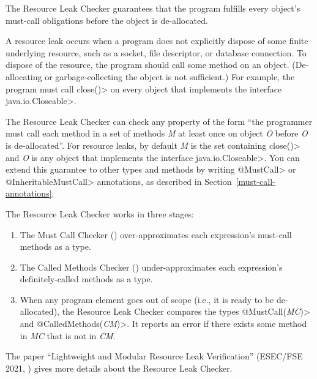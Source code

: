 \htmlhr
{}

The Resource Leak Checker guarantees that the program fulfills every object's
must-call obligations before the object is de-allocated.

A resource leak occurs when a program does not explicitly dispose of some finite
underlying resource, such as a socket, file descriptor, or database connection.  To dispose
of the resource, the program should call some method on an object.
(De-allocating or garbage-collecting the object is not sufficient.)  For
example, the program must call \<close()> on every object that implements the
interface \<java.io.Closeable>.

The Resource Leak Checker can check any property of the form ``the programmer
must call each method in a set of methods \emph{M} at least once
on object \emph{O} before \emph{O} is de-allocated''.  For resource leaks,
by default \emph{M} is the set containing
\<close()> and \emph{O} is any object that implements the interface
\<java.io.Closeable>.  You can extend this guarantee to other types and methods
by writing \<@MustCall> or \<@InheritableMustCall> annotations, as described in
Section~\ref{must-call-annotations}.

The Resource Leak Checker works in three stages:
\begin{enumerate}
\item The Must Call Checker ()
  over-approximates each expression's must-call methods as a
   type.
\item The Called Methods Checker ()
  under-approximates each expression's definitely-called methods as a
   type.
\item When any program element goes out of scope (i.e., it is ready to be
  de-allocated), the Resource Leak Checker compares the types
  \<@MustCall(\emph{MC})> and \<@CalledMethods(\emph{CM})>.  It reports an error
  if there exists some method in \emph{MC} that is not in \emph{CM}.
\end{enumerate}

The paper
``Lightweight and Modular Resource Leak Verification'' (ESEC/FSE 2021,
)
gives more details about the Resource Leak Checker.


